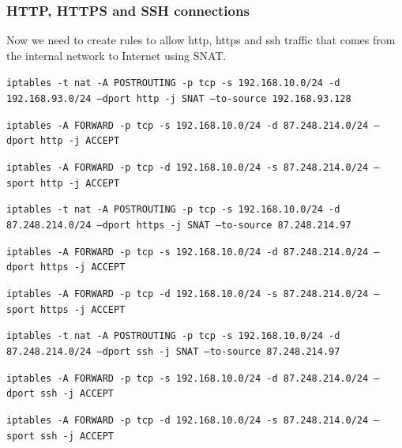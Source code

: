 \documentclass{article}
\begin{document}
\subsubsection{HTTP, HTTPS and SSH connections}
\quad Now we need to create rules to allow http, https and ssh traffic that comes from the internal network to Internet using SNAT.

\texttt{}\par
\texttt{iptables -t nat -A POSTROUTING -p tcp -s 192.168.10.0/24 -d 192.168.93.0/24 --dport http -j SNAT --to-source 192.168.93.128 }\par
\texttt{iptables -A FORWARD -p tcp -s 192.168.10.0/24 -d 87.248.214.0/24   --dport http -j ACCEPT}\par
\texttt{iptables -A FORWARD -p tcp -d 192.168.10.0/24 -s 87.248.214.0/24   --sport http -j ACCEPT}\par
\texttt{}\par
\texttt{}\par
\texttt{iptables -t nat -A POSTROUTING -p tcp -s 192.168.10.0/24 -d  87.248.214.0/24 --dport https -j SNAT --to-source 87.248.214.97}\par
\texttt{iptables -A FORWARD -p tcp -s 192.168.10.0/24 -d 87.248.214.0/24   --dport https -j ACCEPT}\par
\texttt{iptables -A FORWARD -p tcp -d 192.168.10.0/24 -s 87.248.214.0/24   --sport https -j ACCEPT}\par
\texttt{}\par
\texttt{}\par
\texttt{iptables -t nat -A POSTROUTING -p tcp -s 192.168.10.0/24 -d  87.248.214.0/24 --dport ssh -j SNAT --to-source 87.248.214.97}\par
\texttt{iptables -A FORWARD -p tcp -s 192.168.10.0/24 -d 87.248.214.0/24   --dport ssh -j ACCEPT}\par
\texttt{iptables -A FORWARD -p tcp -d 192.168.10.0/24 -s 87.248.214.0/24   --sport ssh -j ACCEPT}\par
\texttt{}\par
\end{document}
